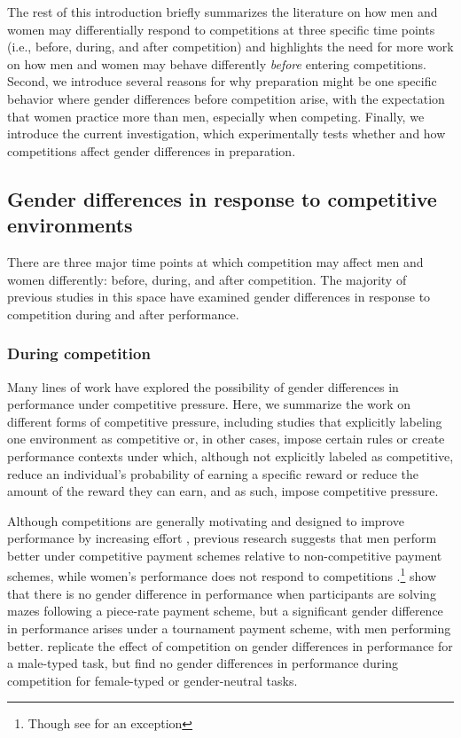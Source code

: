 \documentclass[letterpaper, nobind]{templates/ociamthesis}
\begin{document}
The rest of this introduction briefly summarizes the literature on how men and women may differentially respond to competitions at three specific time points (i.e., before, during, and after competition) and highlights the need for more work on how men and women may behave differently \emph{before} entering competitions. Second, we introduce several reasons for why preparation might be one specific behavior where gender differences before competition arise, with the expectation that women practice more than men, especially when competing. Finally, we introduce the current investigation, which experimentally tests whether and how competitions affect gender differences in preparation.

\hypertarget{gender-differences-in-response-to-competitive-environments}{%
\subsection{Gender differences in response to competitive environments}\label{gender-differences-in-response-to-competitive-environments}}

There are three major time points at which competition may affect men and women differently: before, during, and after competition. The majority of previous studies in this space have examined gender differences in response to competition during and after performance.

\hypertarget{during-competition}{%
\subsubsection{During competition}\label{during-competition}}

Many lines of work have explored the possibility of gender differences in performance under competitive pressure. Here, we summarize the work on different forms of competitive pressure, including studies that explicitly labeling one environment as competitive or, in other cases, impose certain rules or create performance contexts under which, although not explicitly labeled as competitive, reduce an individual's probability of earning a specific reward or reduce the amount of the reward they can earn, and as such, impose competitive pressure.

Although competitions are generally motivating and designed to improve performance by increasing effort \autocite{Connelly2014a,Murayama2012,Miller2019a}, previous research suggests that men perform better under competitive payment schemes relative to non-competitive payment schemes, while women's performance does not respond to competitions \autocite{Gneezy2003,Gneezy2004,Gunther2010,Samak2013,Booth2022,Gneezy2004,Niederle2011,Cotton2013}.\footnote{Though see \textcite{Dreber2011} for an exception} \textcite{Gneezy2003} show that there is no gender difference in performance when participants are solving mazes following a piece-rate payment scheme, but a significant gender difference in performance arises under a tournament payment scheme, with men performing better. \textcite{Gunther2010} replicate the effect of competition on gender differences in performance for a male-typed task, but find no gender differences in performance during competition for female-typed or gender-neutral tasks.
\end{document}
